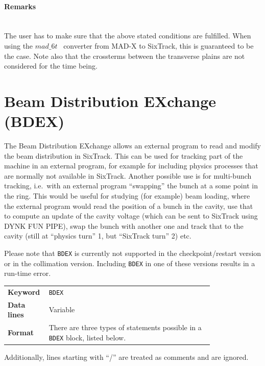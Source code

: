 \paragraph{Remarks}~\\

The user has to make sure that the above stated conditions are fulfilled.
When using the $mad\_6t$~\cite{CONVERTOR} converter from MAD-X to SixTrack, this is guaranteed to be the case.
Note also that the crossterms between the transverse plains are not considered for the time being.

\section{Beam Distribution EXchange (BDEX)} \label{sec:BDEX}

The Beam Distribution EXchange allows an external program to read and modify the beam distribution in SixTrack.
This can be used for tracking part of the machine in an external program, for example for including physics processes that are normally not available in SixTrack.
Another possible use is for multi-bunch tracking, i.e.\ with an external program ``swapping'' the bunch at a some point in the ring.
This would be useful for studying (for example) beam loading, where the external program would read the position of a bunch in the cavity, use that to compute an update of the cavity voltage (which can be sent to SixTrack using DYNK FUN PIPE), swap the bunch with another one and track that to the cavity (still at ``physics turn'' 1, but ``SixTrack turn'' 2) etc.

Please note that \texttt{BDEX} is currently not supported in the checkpoint/restart version or in the collimation version.
Including \texttt{BDEX} in one of these versions results in a run-time error.

\bigskip
\begin{tabular}{@{}lp{0.8\linewidth}}
    \textbf{Keyword}    & \texttt{BDEX} \\
    \textbf{Data lines} & Variable \\
    \textbf{Format}     & There are three types of statements possible in a \texttt{BDEX} block, listed below.
\end{tabular}

\bigskip
Additionally, lines starting with ``/'' are treated as comments and are ignored.

